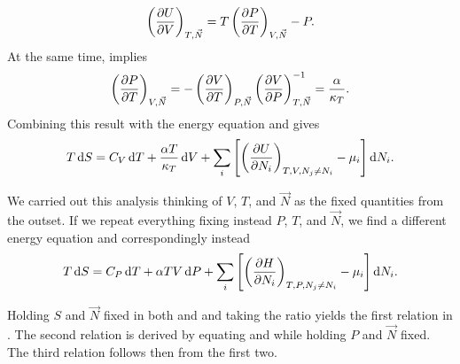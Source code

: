 \begin{equation}\label{eq:energyEquation}
\left(\pdv{U}{V}\right)_{T,\vec{N}}
=T\left(\pdv{P}{T}\right)_{V,\vec{N}}-P.
\end{equation}
At the same time,  implies
\begin{equation}
\left(\pdv{P}{T}\right)_{V,\vec{N}}
=-\left(\pdv{V}{T}\right)_{P,\vec{N}}\left(\pdv{V}{P}\right)_{T,\vec{N}}^{-1}
=\frac{\alpha}{\kappa_T}.
\end{equation} 
Combining this result with the energy equation and
 gives 
\begin{equation}\label{eq:TdS1}
T\dd{S} = C_V \dd{T} + \frac{\alpha T}{\kappa_T}\dd{V}
+ \sum_i \left[\left(\pdv{U}{N_i}\right)_{T,V,N_j\neq N_i}-\mu_i\right]\dd N_i.
\end{equation}

We carried out this analysis thinking of $V$, $T$, and $\vec{N}$ as the fixed
quantities from the outset. If we repeat everything fixing instead $P$, $T$, and
$\vec{N}$, we find a different energy equation and correspondingly instead
\begin{equation}\label{eq:TdS2}
T\dd{S} = C_P \dd{T} + \alpha T V\dd{P}
+ \sum_i \left[\left(\pdv{H}{N_i}\right)_{T,P,N_j\neq N_i}-\mu_i\right]\dd N_i.
\end{equation}

Holding $S$ and $\vec{N}$ fixed in both
 and  and taking the ratio
yields the first relation in .
The second relation is derived by equating  and 
 while holding $P$ and $\vec{N}$ fixed.
The third relation follows then from the first two. 




